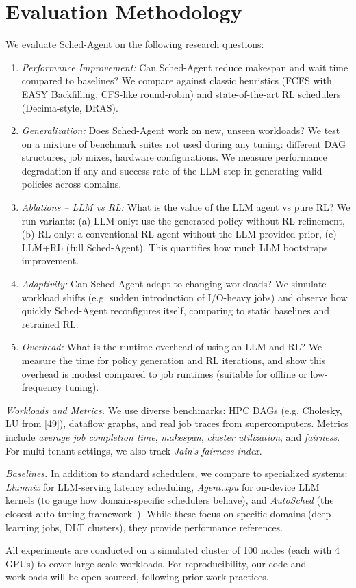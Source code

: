 \section{Evaluation Methodology}

We evaluate Sched-Agent on the following research questions:

\begin{enumerate}
\item \emph{Performance Improvement:} Can Sched-Agent reduce makespan and wait time compared to baselines? We compare against classic heuristics (FCFS with EASY Backfilling, CFS-like round-robin) and state-of-the-art RL schedulers (Decima-style, DRAS).
\item \emph{Generalization:} Does Sched-Agent work on new, unseen workloads? We test on a mixture of benchmark suites not used during any tuning: different DAG structures, job mixes, hardware configurations. We measure performance degradation if any and success rate of the LLM step in generating valid policies across domains.
\item \emph{Ablations -- LLM vs RL:} What is the value of the LLM agent vs pure RL? We run variants: (a) LLM-only: use the generated policy without RL refinement, (b) RL-only: a conventional RL agent without the LLM-provided prior, (c) LLM+RL (full Sched-Agent). This quantifies how much LLM bootstraps improvement.
\item \emph{Adaptivity:} Can Sched-Agent adapt to changing workloads? We simulate workload shifts (e.g. sudden introduction of I/O-heavy jobs) and observe how quickly Sched-Agent reconfigures itself, comparing to static baselines and retrained RL.
\item \emph{Overhead:} What is the runtime overhead of using an LLM and RL? We measure the time for policy generation and RL iterations, and show this overhead is modest compared to job runtimes (suitable for offline or low-frequency tuning).
\end{enumerate}

\emph{Workloads and Metrics.} We use diverse benchmarks: HPC DAGs (e.g. Cholesky, LU from [49]), dataflow graphs, and real job traces from supercomputers. Metrics include \emph{average job completion time}, \emph{makespan}, \emph{cluster utilization}, and \emph{fairness}. For multi-tenant settings, we also track \emph{Jain's fairness index}.

\emph{Baselines.} In addition to standard schedulers, we compare to specialized systems: \emph{Llumnix} for LLM-serving latency scheduling, \emph{Agent.xpu} for on-device LLM kernels (to gauge how domain-specific schedulers behave), and \emph{AutoSched} (the closest auto-tuning framework~\cite{tianweiz07,tianweiz07b}). While these focus on specific domains (deep learning jobs, DLT clusters), they provide performance references.

All experiments are conducted on a simulated cluster of 100 nodes (each with 4 GPUs) to cover large-scale workloads. For reproducibility, our code and workloads will be open-sourced, following prior work practices.